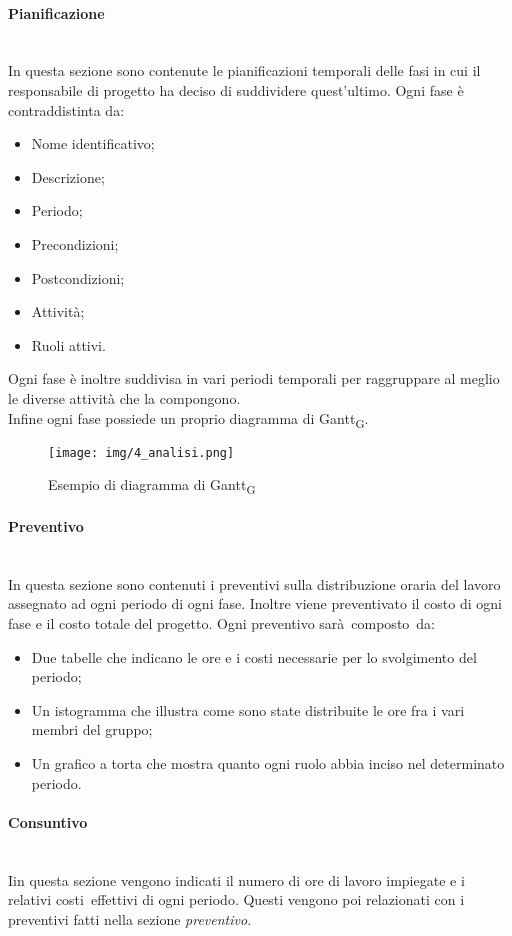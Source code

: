 \paragraph {Pianificazione}\mbox{}\\
In questa sezione sono contenute le pianificazioni temporali delle fasi in cui il responsabile di progetto ha deciso di suddividere quest'ultimo.
Ogni fase è contraddistinta da:
\begin{itemize}
	\item Nome identificativo;
	\item Descrizione;
	\item Periodo;
	\item Precondizioni;
	\item Postcondizioni;
	\item Attività;
	\item Ruoli attivi.
\end{itemize}
Ogni fase è inoltre suddivisa in vari periodi temporali per raggruppare al meglio le diverse attività che la compongono.\\
Infine ogni fase possiede un proprio diagramma di Gantt\textsubscript{G}.
\begin{figure}[h!]
	\centering
	\texttt{[image: img/4\_analisi.png]}
	\caption{Esempio di diagramma di Gantt\textsubscript{G}}
\end{figure}
\paragraph {Preventivo}\mbox{}\\
In questa sezione sono contenuti i preventivi sulla distribuzione oraria del lavoro assegnato ad ogni periodo di ogni fase. Inoltre viene preventivato il costo di ogni fase e il costo totale del progetto. Ogni preventivo sarà composto da:
\begin{itemize}
	\item Due tabelle che indicano le ore e i costi necessarie per lo svolgimento del periodo;
	\item Un istogramma che illustra come sono state distribuite le ore fra i vari membri del gruppo;
	\item Un grafico a torta che mostra quanto ogni ruolo abbia inciso nel determinato periodo.
\end{itemize}
\paragraph {Consuntivo}\mbox{}\\
Iin questa sezione vengono indicati il numero di ore di lavoro impiegate e i relativi costi effettivi di ogni periodo. Questi vengono poi relazionati con i preventivi fatti nella sezione \textit{preventivo}.

